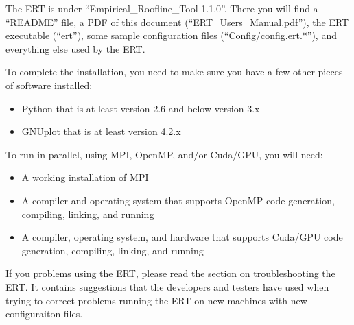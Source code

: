 The ERT is under ``Empirical\_Roofline\_Tool-1.1.0''.  There you will find a
``README'' file, a PDF of this document (``ERT\_Users\_Manual.pdf''), the ERT
executable (``ert''), some sample configuration files
(``Config/config.ert.*''), and everything else used by the ERT.

To complete the installation, you need to make sure you have a few other
pieces of software installed:

\begin{itemize}

\vspace{-0.1in}
\item{Python that is at least version 2.6 and below version 3.x}

\vspace{-0.1in}
\item{GNUplot that is at least version 4.2.x}

\end{itemize}

To run in parallel, using MPI, OpenMP, and/or Cuda/GPU, you will need:

\begin{itemize}

\vspace{-0.1in}
\item{A working installation of MPI}

\vspace{-0.1in}
\item{A compiler and operating system that supports OpenMP code generation,
compiling, linking, and running}

\vspace{-0.1in}
\item{A compiler, operating system, and hardware that supports Cuda/GPU
code generation, compiling, linking, and running}

\end{itemize}

If you problems using the ERT, please read the section on troubleshooting the
ERT.  It contains suggestions that the developers and testers have used when
trying to correct problems running the ERT on new machines with new
configuraiton files.
